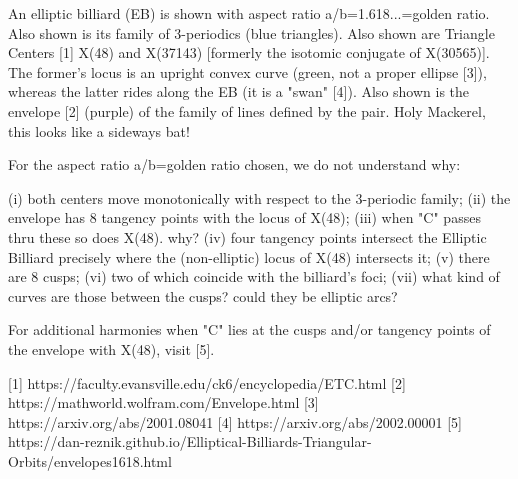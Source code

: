 An elliptic billiard (EB) is shown with aspect ratio a/b=1.618...=golden ratio. Also shown is its family of 3-periodics (blue triangles). Also shown are Triangle Centers [1] X(48) and X(37143) [formerly the isotomic conjugate of X(30565)]. The former's locus is an upright convex curve (green, not a proper ellipse [3]), whereas the latter rides along the EB (it is a "swan" [4]). Also shown is the envelope [2] (purple) of the family of lines defined by the pair. Holy Mackerel, this looks like a sideways bat!

For the aspect ratio a/b=golden ratio chosen, we do not understand why:

(i) both centers move monotonically with respect to the 3-periodic family;
(ii) the envelope has 8 tangency points with the locus of X(48); 
(iii) when "C" passes thru these so does X(48). why?
(iv) four tangency points intersect the Elliptic Billiard precisely where the (non-elliptic) locus of X(48) intersects it;
(v) there are 8 cusps;
(vi) two of which coincide with the billiard's foci;
(vii) what kind of curves are those between the cusps? could they be elliptic arcs?

For additional harmonies when "C" lies at the cusps and/or tangency points of the envelope with X(48), visit [5].

[1] https://faculty.evansville.edu/ck6/encyclopedia/ETC.html
[2] https://mathworld.wolfram.com/Envelope.html
[3] https://arxiv.org/abs/2001.08041
[4] https://arxiv.org/abs/2002.00001
[5] https://dan-reznik.github.io/Elliptical-Billiards-Triangular-Orbits/envelopes1618.html